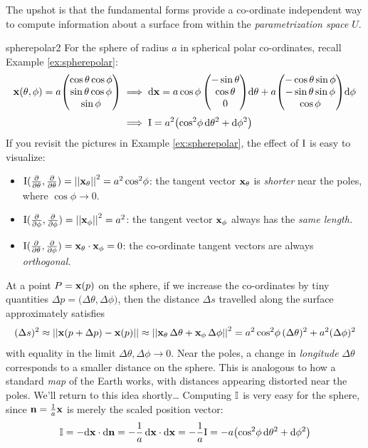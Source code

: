 The upshot is that the fundamental forms provide a co-ordinate independent way to compute information about a surface from within the \emph{parametrization space} $U$.


\begin{example}{}{spherepolar2}
	For the sphere of radius $a$ in spherical polar co-ordinates, recall Example \ref{ex:spherepolar}:
	\begin{align*}
		{\mathbf{x}}(\theta,\phi) =a\!\begin{pmatrix}\cos\theta\cos\phi\\\sin\theta\cos\phi\\\sin\phi\end{pmatrix}&\implies\mathrm{d}{\mathbf{x}} =a\cos\phi\begin{pmatrix}-\sin\theta\\\cos\theta\\0\end{pmatrix}\!{\mathrm{d}\theta}+a\!\begin{pmatrix}-\cos\theta\sin\phi\\-\sin\theta\sin\phi\\\cos\phi\end{pmatrix}\!\mathrm{d}\phi\\[3pt]
		&\implies \mathrm{I}=a^2\bigl(\cos^2\!\phi\,\mathrm{d}\theta^2+\mathrm{d}\phi^2\bigr)
	\end{align*}
	If you revisit the pictures in Example \ref{ex:spherepolar}, the effect of $\mathrm{I}$ is easy to visualize:
	\begin{itemize}\itemsep2pt
	  \item $\mathrm{I}(\frac{\partial }{\partial \theta},\frac{\partial }{\partial \theta})=\left| \left| {\mathbf{x}}_\theta\right|\right|^2=a^2\cos^2\!\phi$: the tangent vector ${\mathbf{x}}_\theta$ is \emph{shorter} near the poles, where $\cos\phi\to 0$.
	  \item $\mathrm{I}(\frac{\partial }{\partial \phi},\frac{\partial }{\partial \phi})=\left| \left| {\mathbf{x}}_\phi\right|\right|^2=a^2$: the tangent vector ${\mathbf{x}}_\phi$ always has the \emph{same length.}
	  \item $\mathrm{I}(\frac{\partial }{\partial \theta},\frac{\partial }{\partial \phi})={\mathbf{x}}_\theta\cdot{\mathbf{x}}_\phi=0$: the co-ordinate tangent vectors are always \emph{orthogonal.}
	\end{itemize}
	At a point $P={\mathbf{x}}(p)$ on the sphere, if we increase the co-ordinates by tiny quantities $\Delta p=\bigl(\Delta\theta,\Delta\phi)$, then the distance $\Delta s$ travelled along the surface approximately satisfies
	\[
		(\Delta s)^2\approx \left| \left| {\mathbf{x}}(p+\Delta p)-{\mathbf{x}}(p)\right|\right|\approx \left| \left| {\mathbf{x}}_\theta\,\Delta\theta+{\mathbf{x}}_\phi\,\Delta\phi\right|\right|^2= a^2\cos^2\!\phi\,(\Delta\theta)^2+a^2(\Delta\phi)^2
	\]
	with equality in the limit $\Delta\theta,\Delta\phi\to 0$. Near the poles, a change in \emph{longitude} $\Delta\theta$ corresponds to a smaller distance on the sphere. This is analogous to how a standard \emph{map} of the Earth works, with distances appearing distorted near the poles. We'll return to this idea shortly\ldots\smallbreak
	Computing $\mathbb{I}$ is very easy for the sphere, since ${\mathbf{n}}=\frac 1a{\mathbf{x}}$ is merely the scaled position vector:
	\[
		\mathbb{I}=-\mathrm{d}{\mathbf{x}}\cdot\mathrm{d}{\mathbf{n}}=-\frac{1}{a}\,\mathrm{d}{\mathbf{x}}\cdot\mathrm{d}{\mathbf{x}}=-\frac{1}{a}\mathrm{I} =-a\bigl(\cos^2\!\phi\,\mathrm{d}\theta^2+\mathrm{d}\phi^2\bigr)
	\]
\end{example}


